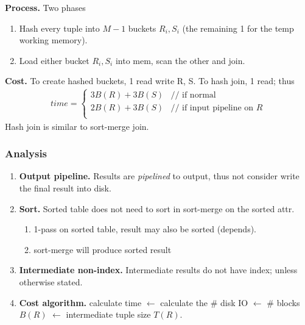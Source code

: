 \documentclass[a4paper]{report}
\begin{document}
\begin{enumerate}
\textbf{Process.} Two phases
\begin{enumerate}
\item Hash every tuple into $M-1$ buckets $R_i, S_i$ (the remaining 1 for the temp working memory).
\item Load either bucket $R_i, S_i$ into mem, scan the other and join.
\end{enumerate}
\textbf{Cost.} To create hashed buckets, 1 read write R, S. To hash join, 1 read; thus 
\begin{eqnarray*}
time = \left\{ \begin{array}{rl}
  3B(R)+3B(S) &\text{// if normal} \\
  2B(R)+3B(S) &\text{// if input pipeline on $R$}\\
       \end{array} \right.
\end{eqnarray*}
Hash join is similar to sort-merge join. 
\end{enumerate}

\subsubsection{Analysis}
\begin{enumerate}
\item \textbf{Output pipeline.} Results are \textit{pipelined} to output, thus not consider write the final result into disk. 
\item \textbf{Sort.} Sorted table does not need to sort in sort-merge on the sorted attr.
\begin{enumerate}
\item 1-pass on sorted table, result may also be sorted (depends).
\item sort-merge will produce sorted result
\end{enumerate}
\item \textbf{Intermediate non-index.} Intermediate results do not have index; unless otherwise stated.  
\item \textbf{Cost algorithm.} calculate time $\leftarrow$ calculate the \# disk IO $\leftarrow$ \# blocks $B(R)$ $\leftarrow$ intermediate tuple size $T(R)$. 
\end{enumerate}
\end{document}

